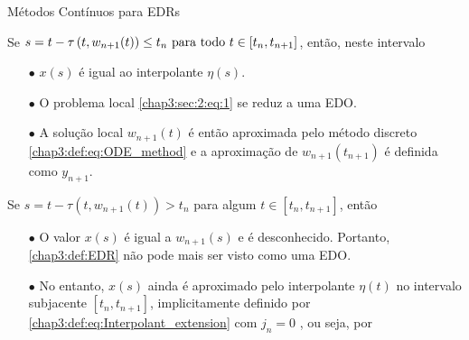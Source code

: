 \documentclass{beamer}
\theoremstyle{plain}
\theoremstyle{definition}
\begin{document}
\begin{frame}{Métodos Contínuos para EDRs}

    Se \( s=t-\tau\left(t, w_{n+1}(t)\right) \leq t_{n}$ para todo $t \in\left[t_{n}, t_{n+1}\right]\), então, neste intervalo

    \begin{itemize}
        \item[$\bullet$] \( x(s) \) é igual ao interpolante \(\eta(s)\). 

        \item[$\bullet$]  O problema local \eqref{chap3:sec:2:eq:1} se reduz a uma EDO. 

        \item[$\bullet$] A solução local \( w_{n+1}(t) \) é então aproximada pelo método discreto \eqref{chap3:def:eq:ODE_method} e a aproximação de \( w_{n+1}\left(t_{n+1}\right) \) é definida como \( y_{n+1} \).

    \end{itemize}

    Se \( s=t-\tau\left(t, w_{n+1}(t)\right)>t_{n} \) para algum \( t \in\left[t_{n}, t_{n+1}\right] \), então

    \begin{itemize}
        \item[$\bullet$] O valor \( x(s) \) é igual a \( w_{n+1}(s) \) e é desconhecido. Portanto, \eqref{chap3:def:EDR} não pode mais ser visto como uma EDO. 

        \item[$\bullet$] No entanto, \( x(s) \) ainda é aproximado pelo interpolante \( \eta(t) \) no intervalo subjacente \( \left[t_{n}, t_{n+1}\right] \), implicitamente definido por \eqref{chap3:def:eq:Interpolant_extension} com \( j_{n}=0\) , ou seja, por
    \end{itemize}





\end{frame}


\end{document}
